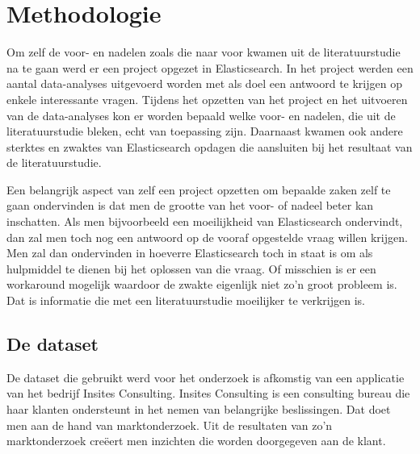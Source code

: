 
\chapter{Methodologie}
\label{ch:methodologie}


Om zelf de voor- en nadelen zoals die naar voor kwamen uit de literatuurstudie na te gaan werd er een project opgezet in Elasticsearch. In het project werden een aantal data-analyses uitgevoerd worden met als doel een antwoord te krijgen op enkele interessante vragen. Tijdens het opzetten van het project en het uitvoeren van de data-analyses kon er worden bepaald welke voor- en nadelen, die uit de literatuurstudie bleken, echt van toepassing zijn. Daarnaast kwamen ook andere sterktes en zwaktes van Elasticsearch opdagen die aansluiten bij het resultaat van de literatuurstudie.

Een belangrijk aspect van zelf een project opzetten om bepaalde zaken zelf te gaan ondervinden is dat men de grootte van het voor- of nadeel beter kan inschatten. Als men bijvoorbeeld een moeilijkheid van Elasticsearch ondervindt, dan zal men toch nog een antwoord op de vooraf opgestelde vraag willen krijgen. Men zal dan ondervinden in hoeverre Elasticsearch toch in staat is om als hulpmiddel te dienen bij het oplossen van die vraag. Of misschien is er een workaround mogelijk waardoor de zwakte eigenlijk niet zo'n groot probleem is. Dat is informatie die met een literatuurstudie moeilijker te verkrijgen is.

\section{De dataset}
De dataset die gebruikt werd voor het onderzoek is afkomstig van een applicatie van het bedrijf Insites Consulting. Insites Consulting is een consulting bureau die haar klanten ondersteunt in het nemen van belangrijke beslissingen. Dat doet men aan de hand van marktonderzoek. Uit de resultaten van zo'n marktonderzoek creëert men inzichten die worden doorgegeven aan de klant. 

